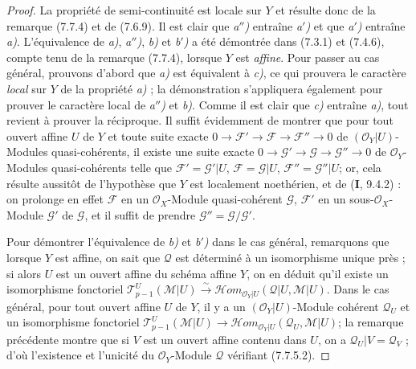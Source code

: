 \begin{proof}
La propriété de semi-continuité est locale sur $Y$ et résulte donc de la
remarque (7.7.4) et de (7.6.9). Il est clair que \emph{a$''$)} entraîne \emph{a$'$)} et que
\emph{a$'$)} entraîne \emph{a)}. L'équivalence de \emph{a)}, \emph{a$''$)}, \emph{b)} et \emph{b$'$)} a été démontrée
dans (7.3.1) et (7.4.6), compte tenu de la remarque (7.7.4), lorsque $Y$ est
\emph{affine}. Pour passer au cas général, prouvons d'abord que \emph{a)} est équivalent à \emph{c)},
ce qui prouvera le caractère \emph{local} sur $Y$ de la propriété \emph{a)} ; la démonstration
s'appliquera également pour prouver le caractère local de \emph{a$''$)} et \emph{b)}. Comme il
est clair que \emph{c)} entraîne \emph{a)}, tout revient à prouver la réciproque. Il suffit
évidemment de montrer que pour tout ouvert affine $U$ de $Y$ et toute suite
exacte
$0\longrightarrow\mathscr F'\longrightarrow\mathscr F\longrightarrow\mathscr F''\longrightarrow0$
de $(\mathscr O_Y|U)$-Modules quasi-cohérents, il existe une suite exacte
$0\longrightarrow\mathscr G'\longrightarrow\mathscr G\longrightarrow\mathscr G''\longrightarrow0$
de $\mathscr O_Y$-Modules quasi-cohérents telle que
$\mathscr F'=\mathscr G'|U$, $\mathscr F=\mathscr G|U$, $\mathscr F''=\mathscr G''|U$;
or, cela résulte aussitôt de l'hypothèse que $Y$ est localement noethérien, et
de (\textbf{I}, 9.4.2) : on prolonge en effet $\mathscr F$ en un $\mathscr O_X$-Module
quasi-cohérent $\mathscr G$, $\mathscr F'$ en un sous-$\mathscr O_X$-Module
$\mathscr G'$ de $\mathscr G$, et il suffit de prendre
$\mathscr G''=\mathscr G/\mathscr G'$.

Pour démontrer l'équivalence de \emph{b)} et \emph{b$'$)} dans le cas général, remarquons que
lorsque $Y$ est affine, on sait que $\mathscr Q$ est déterminé à un isomorphisme
unique près ; si alors $U$ est un ouvert affine du schéma affine $Y$, on en
déduit qu'il existe un isomorphisme fonctoriel
$\mathscr T_{p-1}^{U}(\mathscr M|U)\xrightarrow{\sim}\mathscr{H}\!om_{\mathscr O_Y|U}(\mathscr Q|U,\mathscr M|U)$.
Dans le cas général, pour tout ouvert affine $U$ de $Y$, il y a un
$(\mathscr O_Y|U)$-Module cohérent $\mathscr Q_U$ et un isomorphisme fonctoriel
$\mathscr T_{p-1}^{U}(\mathscr M|U)\to\mathscr{H}\!om_{\mathscr O_Y|U}(\mathscr Q_U,\mathscr M|U)$;
la remarque précédente montre que si $V$ est un ouvert affine contenu dans $U$,
on a $\mathscr Q_U|V=\mathscr Q_V$ ; d'où l'existence et l'unicité du
$\mathscr O_Y$-Module $\mathscr Q$ vérifiant (7.7.5.2).


\end{proof}
